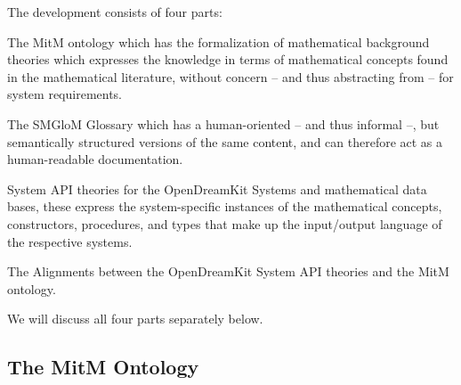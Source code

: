 \documentclass[book]{deliverablereport}
\begin{document}
The development consists of four parts:
\begin{compactenum}[\em i\rm)]
\item The MitM ontology which has the formalization of mathematical background theories
  which expresses the knowledge in terms of mathematical concepts found in the
  mathematical literature, without concern -- and thus abstracting from -- for system
  requirements.
\item The SMGloM Glossary which has a human-oriented -- and thus informal --, but
  semantically structured versions of the same content, and can therefore act as a
  human-readable documentation.
\item System API theories for the OpenDreamKit Systems and mathematical data bases, these
  express the system-specific instances of the mathematical concepts, constructors,
  procedures, and types that make up the input/output language of the respective systems.
\item The Alignments between the OpenDreamKit System API theories and the MitM ontology. 
\end{compactenum}
We will discuss all four parts separately below.

\subsection{The MitM Ontology}\label{sec:mitmonto}
\end{document}
